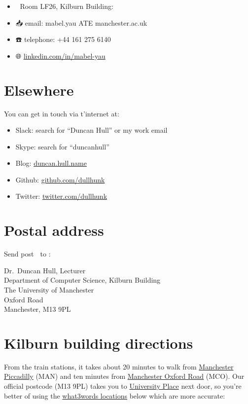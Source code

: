 \documentclass[12pt,]{book}
\providecommand{\tightlist}{%
  \setlength{\itemsep}{0pt}\setlength{\parskip}{0pt}}
\begin{document}
\begin{itemize}
\tightlist
\item
  🏢 Room LF26, Kilburn Building:
\item
  📥 email: mabel.yau ATE manchester.ac.uk
\item
  ☎️ telephone: +44 161 275 6140
\item
  🌐 \href{https://uk.linkedin.com/in/mabel-yau}{linkedin.com/in/mabel-yau}
\end{itemize}

\hypertarget{elsewhere}{%
\section{Elsewhere}\label{elsewhere}}

You can get in touch via t'internet at:

\begin{itemize}
\tightlist
\item
  Slack: search for ``Duncan Hull'' or my work email
\item
  Skype: search for ``duncanhull''
\item
  Blog: \href{https://duncan.hull.name}{duncan.hull.name}
\item
  Github: \href{https://github.com/dullhunk}{github.com/dullhunk}
\item
  Twitter: \href{https://twitter.com/dullhunk}{twitter.com/dullhunk}
\end{itemize}

\hypertarget{postal-address}{%
\section{Postal address}\label{postal-address}}

Send post 🐌 to :

Dr.~Duncan Hull, Lecturer\\
Department of Computer Science, Kilburn Building\\
The University of Manchester\\
Oxford Road\\
Manchester, M13 9PL

\hypertarget{kilburn-building-directions}{%
\section{Kilburn building directions}\label{kilburn-building-directions}}

From the train stations, it takes about 20 minutes to walk from \href{https://www.nationalrail.co.uk/stations_destinations/man.aspx}{Manchester Piccadilly} (MAN) and ten minutes from \href{https://www.nationalrail.co.uk/stations/mco/details.aspx}{Manchester Oxford Road} (MCO). Our official postcode (M13 9PL) takes you to \href{http://www.conference.manchester.ac.uk/venues/search/details/?property=10}{University Place} next door, so you're better of using the \href{https://www.bbc.co.uk/news/uk-england-49319760}{what3words locations} below which are more accurate:
\end{document}
